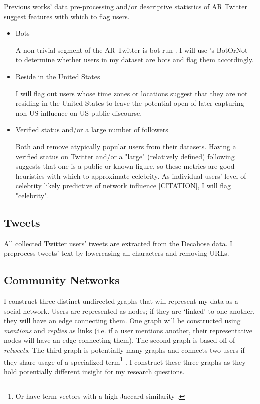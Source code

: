 \documentclass[acmlarge, screen, authorversion]{acmart}
\begin{document}
Previous works' \cite{bergerAltrightTwitterCensus2018, alizadehPsychologyMoralityPolitical2019} data pre-processing and/or descriptive statistics of AR Twitter suggest features with which to flag users.

\begin{itemize}
	\item Bots

	      A non-trivial segment of the AR Twitter is bot-run \cite{bergerAltrightTwitterCensus2018}. I will use \citet{davisBotOrNotSystemEvaluate2016}'s BotOrNot to determine whether users in my dataset are bots and flag them accordingly.

	\item Reside in the United States

	      I will flag out users whose time zones or locations suggest that they are not residing in the United States to leave the potential open of later capturing non-US influence on US public discourse.

	\item Verified status and/or a large number of followers

	      Both \citet{bergerAltrightTwitterCensus2018} and \citet{alizadehPsychologyMoralityPolitical2019} remove atypically popular users from their datasets. Having a verified status on Twitter and/or a "large" (relatively defined) following suggests that one is a public or known figure, so these metrics are good heuristics with which to approximate celebrity. As individual users' level of celebrity likely predictive of network influence [CITATION], I will flag "celebrity".

\end{itemize}

\subsection{Tweets}

All collected Twitter users' tweets are extracted from the Decahose data. I preprocess tweets' text by lowercasing all characters and removing URLs.

\subsection{Community Networks}

I construct three distinct undirected graphs that will represent my data as a social network. Users are represented as nodes; if they are `linked' to one another, they will have an edge connecting them. One graph will be constructed using \textit{mentions} and \textit{replies} as links (i.e. if a user mentions another, their representative nodes will have an edge connecting them). The second graph is based off of \textit{retweets}. The third graph is potentially many graphs and connects two users if they share usage of a specialized term\footnote{Or have term-vectors with a high Jaccard similarity \cite{niwattanakulUsingJaccardCoefficient2013}.} . I construct these three graphs as they hold potentially different insight for my research questions.
\end{document}
